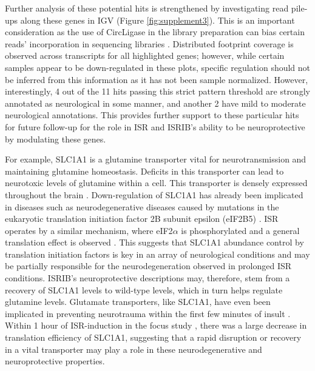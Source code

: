 \documentclass[11pt, a4paper, oneside]{article}
\begin{document}
Further analysis of these potential hits is strengthened by investigating read pile-ups along these genes in IGV \cite{igv} (Figure \ref{fig:supplement3}). This is an important consideration as the use of CircLigase in the library preparation can bias certain reads' incorporation in sequencing libraries \cite{circligase_bias}. Distributed footprint coverage is observed across transcripts for all highlighted genes; however, while certain samples appear to be down-regulated in these plots, specific regulation should not be inferred from this information as it has not been sample normalized. However, interestingly, 4 out of the 11 hits passing this strict pattern threshold are strongly annotated as neurological in some manner, and another 2 have mild to moderate neurological annotations. This provides further support to these particular hits for future follow-up for the role in ISR and ISRIB's ability to be neuroprotective by modulating these genes.

For example, SLC1A1 is a glutamine transporter vital for neurotransmission and maintaining glutamine homeostasis. Deficits in this transporter can lead to neurotoxic levels of glutamine within a cell. This transporter is densely expressed throughout the brain \cite{slc1a1_neurotoxic}. Down-regulation of SLC1A1 has already been implicated in diseases such as neurodegenerative diseases caused by mutations in the eukaryotic translation initiation factor 2B subunit epsilon (eIF2B5) \cite{eif2b_neuroprotective}. ISR operates by a similar mechanism, where eIF2$\alpha$ is phosphorylated and a general translation effect is observed \cite{isrib_riboseq, isrib_structure}. This suggests that SLC1A1 abundance control by translation initiation factors is key in an array of neurological conditions and may be partially responsible for the neurodegeneration observed in prolonged ISR conditions. ISRIB's neuroprotective descriptions may, therefore, stem from a recovery of SLC1A1 levels to wild-type levels, which in turn helps regulate glutamine levels. Glutamate transporters, like SLC1A1, have even been implicated in preventing neurotrauma within the first few minutes of insult \cite{slc1a1_neurotoxic}. Within 1 hour of ISR-induction in the focus study \cite{isrib_riboseq}, there was a large decrease in translation efficiency of SLC1A1, suggesting that a rapid disruption or recovery in a vital transporter may play a role in these neurodegenerative and neuroprotective properties.
\end{document}

